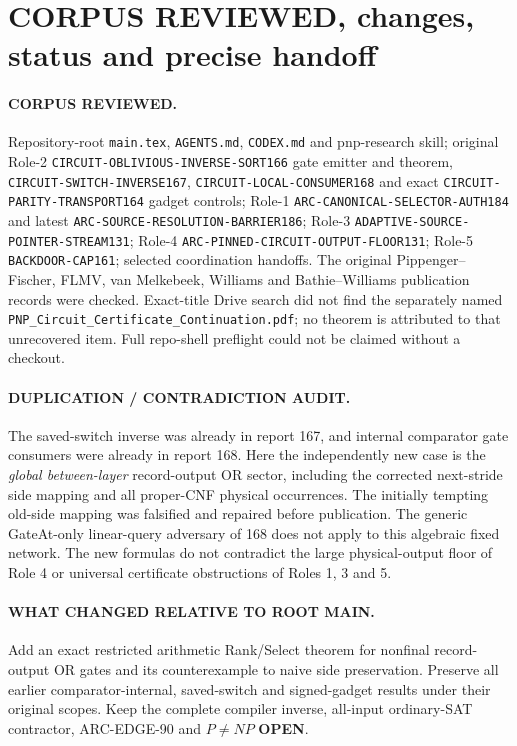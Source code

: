 \documentclass[11pt]{article}
\begin{document}
\section{CORPUS REVIEWED, changes, status and precise handoff}
\paragraph{CORPUS REVIEWED.}
Repository-root \texttt{main.tex}, \texttt{AGENTS.md},
\texttt{CODEX.md} and pnp-research skill; original Role-2
\texttt{CIRCUIT-OBLIVIOUS-INVERSE-SORT166} gate emitter
and theorem, \texttt{CIRCUIT-SWITCH-INVERSE167},
\texttt{CIRCUIT-LOCAL-CONSUMER168} and exact
\texttt{CIRCUIT-PARITY-TRANSPORT164} gadget controls;
Role-1 \texttt{ARC-CANONICAL-SELECTOR-AUTH184} and
latest \texttt{ARC-SOURCE-RESOLUTION-BARRIER186};
Role-3 \texttt{ADAPTIVE-SOURCE-POINTER-STREAM131};
Role-4 \texttt{ARC-PINNED-CIRCUIT-OUTPUT-FLOOR131};
Role-5 \texttt{BACKDOOR-CAP161}; selected coordination
handoffs. The original Pippenger--Fischer, FLMV,
van Melkebeek, Williams and Bathie--Williams
publication records were checked. Exact-title
Drive search did not find the separately named
\texttt{PNP\_Circuit\_Certificate\_Continuation.pdf};
no theorem is attributed to that unrecovered item.
Full repo-shell preflight could not be claimed
without a checkout.

\paragraph{DUPLICATION / CONTRADICTION AUDIT.}
The saved-switch inverse was already in report 167,
and internal comparator gate consumers were already
in report 168. Here the independently new case is
the \emph{global between-layer} record-output OR
sector, including the corrected next-stride side
mapping and all proper-CNF physical occurrences.
The initially tempting old-side mapping was
falsified and repaired before publication.
The generic GateAt-only linear-query adversary of
168 does not apply to this algebraic fixed network.
The new formulas do not contradict the large
physical-output floor of Role 4 or universal
certificate obstructions of Roles 1, 3 and 5.

\paragraph{WHAT CHANGED RELATIVE TO ROOT MAIN.}
Add an exact restricted arithmetic Rank/Select theorem
for nonfinal record-output OR gates and its
counterexample to naive side preservation.
Preserve all earlier comparator-internal,
saved-switch and signed-gadget results under
their original scopes. Keep the complete compiler
inverse, all-input ordinary-SAT contractor,
ARC-EDGE-90 and $P\ne NP$ \textbf{OPEN}.
\end{document}
